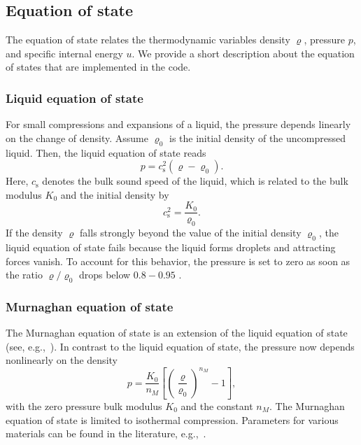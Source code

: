 \documentclass[10pt,fleqn,twoside]{article}
\begin{document}
\subsection{Equation of state}
\label{section:eos}
The equation of state relates the thermodynamic variables density $\varrho$, pressure $p$, and specific internal energy
$u$. We provide a short description about the equation of states that are implemented in the code.
%
\subsubsection{Liquid equation of state}
For small compressions and expansions of a liquid, the pressure depends linearly on the change of density.
Assume $\varrho_0$ is the initial density of the uncompressed liquid. Then, the liquid equation of state reads
%
\begin{equation}
p = c_\mathrm{s}^2 ( \varrho - \varrho_0 ).
\end{equation}
%
Here, $c_\mathrm{s}$ denotes the bulk sound speed of the liquid, which is related to the bulk modulus $K_0$ and the initial
density by
%
\begin{equation}
c_\mathrm{s}^2 = \frac{K_0}{\varrho_0}.
\end{equation}
%
If the density $\varrho$ falls strongly beyond the value of the initial density $\varrho_0$, the liquid equation of
state fails because the liquid forms droplets and attracting forces vanish. To account for this
behavior, the pressure is set to zero as
soon as the ratio $\varrho/ \varrho_0$ drops below $0.8-0.95$ \citep{melosh1996impact}.
%
\subsubsection{Murnaghan equation of state}
The Murnaghan equation of state is an extension of the liquid equation of state (see, e.g.,\ \citealt{melosh1996impact}). In contrast to the liquid equation of
state, the pressure now depends nonlinearly on the density
%
\begin{equation}
p = \frac{K_0}{n_M} \left[ \left( \frac{\varrho}{\varrho_0}\right)^{n_M} -1  \right],
\end{equation}
%
with the zero pressure bulk modulus $K_0$ and the constant $n_M$. The Murnaghan equation of state is limited to
isothermal compression. Parameters for various materials can be found in the literature, e.g.,\ \cite{melosh1996impact}.
%
%
\end{document}
